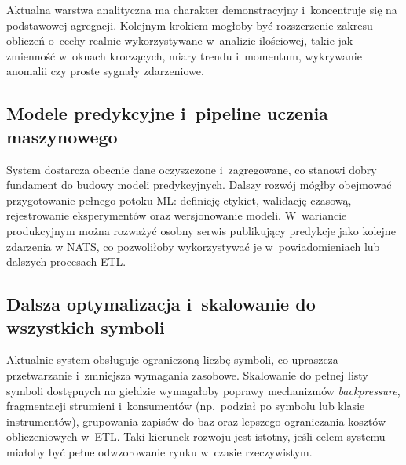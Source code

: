 Aktualna warstwa analityczna ma charakter demonstracyjny i~koncentruje się na podstawowej agregacji.
Kolejnym krokiem mogłoby być rozszerzenie zakresu obliczeń o~cechy realnie wykorzystywane w~analizie
ilościowej, takie jak zmienność w~oknach kroczących, miary trendu i~momentum, wykrywanie anomalii czy proste
sygnały zdarzeniowe.

\subsection[Modele predykcyjne i pipeline uczenia maszynowego]{Modele predykcyjne i~pipeline uczenia maszynowego}

System dostarcza obecnie dane oczyszczone i~zagregowane, co stanowi dobry fundament do budowy modeli predykcyjnych.
Dalszy rozwój mógłby obejmować przygotowanie pełnego potoku ML: definicję etykiet, walidację czasową,
rejestrowanie eksperymentów oraz wersjonowanie modeli.
W~wariancie produkcyjnym można rozważyć osobny serwis publikujący predykcje jako kolejne zdarzenia w
NATS, co pozwoliłoby wykorzystywać je w~powiadomieniach lub dalszych procesach ETL\@.

\subsection[Dalsza optymalizacja i skalowanie do wszystkich symboli]{Dalsza optymalizacja i~skalowanie do wszystkich symboli}

Aktualnie system obsługuje ograniczoną liczbę symboli, co upraszcza przetwarzanie i~zmniejsza wymagania zasobowe.
Skalowanie do pełnej listy symboli dostępnych na giełdzie wymagałoby poprawy mechanizmów \textit{backpressure},
fragmentacji strumieni i~konsumentów (np.\ podział po symbolu lub klasie instrumentów), grupowania zapisów do baz oraz
lepszego ograniczania kosztów obliczeniowych w~ETL\@.
Taki kierunek rozwoju jest istotny, jeśli celem systemu miałoby być pełne odwzorowanie rynku w~czasie rzeczywistym.

